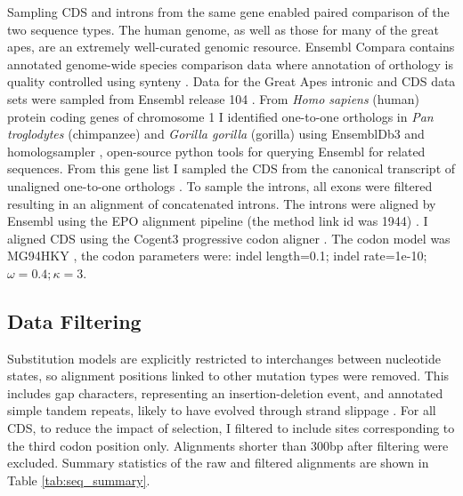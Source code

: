 Sampling CDS and introns from the same gene enabled paired comparison of the two sequence types. The human genome, as well as those for many of the great apes, are an extremely well-curated genomic resource. Ensembl Compara contains annotated genome-wide species comparison data where annotation of orthology is quality controlled using synteny \citep{Herrero2016EnsemblResources}. Data for the Great Apes intronic and CDS data sets were sampled from Ensembl release 104 \citep{Howe2021Ensembl2021}. From \textit{Homo sapiens} (human) protein coding genes of chromosome 1 I identified one-to-one orthologs in \textit{Pan troglodytes} (chimpanzee) and \textit{Gorilla gorilla} (gorilla) using EnsemblDb3 \citep{HuttleyEnsembldb3} and homologsampler \citep{HuttleyHomologsampler}, open-source python tools for querying Ensembl for related sequences. From this gene list I sampled the CDS from the canonical transcript of unaligned one-to-one orthologs \cite{Howe2021Ensembl2021}. To sample the introns, all exons were filtered resulting in an alignment of concatenated introns. The introns were aligned by Ensembl using the EPO alignment pipeline (the method link id was 1944) \citep{Howe2021Ensembl2021}. I aligned CDS using the Cogent3 progressive codon aligner \citep{Knight2007PyCogent:Sequence}. The codon model was MG94HKY \citep{Muse1994AGenome}, the codon parameters were: indel length=0.1; indel rate=1e-10; $\omega=0.4; \kappa=3$. 

\subsection{Data Filtering}
\label{Data Filtering}

Substitution models are explicitly restricted to interchanges between nucleotide states, so alignment positions linked to other mutation types were removed. This includes gap characters, representing an insertion-deletion event, and annotated simple tandem repeats, likely to have evolved through strand slippage \citep{Levinson1987Slipped-strandEvolution}. For all CDS, to reduce the impact of selection, I filtered to include sites corresponding to the third codon position only. Alignments shorter than $300$bp after filtering were excluded. Summary statistics of the raw and filtered alignments are shown in Table \ref{tab:seq_summary}. 



